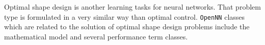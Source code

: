 Optimal shape design is another learning tasks for neural networks. 
That problem type is formulated in a very similar way than optimal control. 
\texttt{OpenNN} classes which are related to the solution of optimal shape design problems include the mathematical model and  
several performance term classes. 

